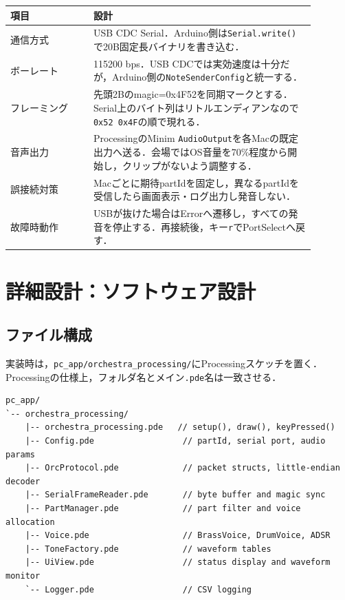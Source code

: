 \documentclass[a4paper,11pt]{jsarticle}
\begin{document}
\begin{longtable}{p{0.24\linewidth}p{0.64\linewidth}}
\hline
項目 & 設計 \\
\hline
\endhead
通信方式 & USB CDC Serial．Arduino側は\texttt{Serial.write()}で20B固定長バイナリを書き込む． \\
\hline
ボーレート & 115200 bps．USB CDCでは実効速度は十分だが，Arduino側の\texttt{NoteSenderConfig}と統一する． \\
\hline
フレーミング & 先頭2Bのmagic=0x4F52を同期マークとする．Serial上のバイト列はリトルエンディアンなので\texttt{0x52 0x4F}の順で現れる． \\
\hline
音声出力 & ProcessingのMinim \texttt{AudioOutput}を各Macの既定出力へ送る．会場ではOS音量を70\%程度から開始し，クリップがないよう調整する． \\
\hline
誤接続対策 & Macごとに期待partIdを固定し，異なるpartIdを受信したら画面表示・ログ出力し発音しない． \\
\hline
故障時動作 & USBが抜けた場合はErrorへ遷移し，すべての発音を停止する．再接続後，キー\texttt{r}でPortSelectへ戻す． \\
\hline
\end{longtable}

\section{詳細設計：ソフトウェア設計}

\subsection{ファイル構成}

実装時は，\texttt{pc\_app/orchestra\_processing/}にProcessingスケッチを置く．
Processingの仕様上，フォルダ名とメイン\texttt{.pde}名は一致させる．

\begin{lstlisting}[style=textdiagram, caption={Processing実装予定ファイル構成}]
pc_app/
`-- orchestra_processing/
    |-- orchestra_processing.pde   // setup(), draw(), keyPressed()
    |-- Config.pde                  // partId, serial port, audio params
    |-- OrcProtocol.pde             // packet structs, little-endian decoder
    |-- SerialFrameReader.pde       // byte buffer and magic sync
    |-- PartManager.pde             // part filter and voice allocation
    |-- Voice.pde                   // BrassVoice, DrumVoice, ADSR
    |-- ToneFactory.pde             // waveform tables
    |-- UiView.pde                  // status display and waveform monitor
    `-- Logger.pde                  // CSV logging
\end{lstlisting}
\end{document}
